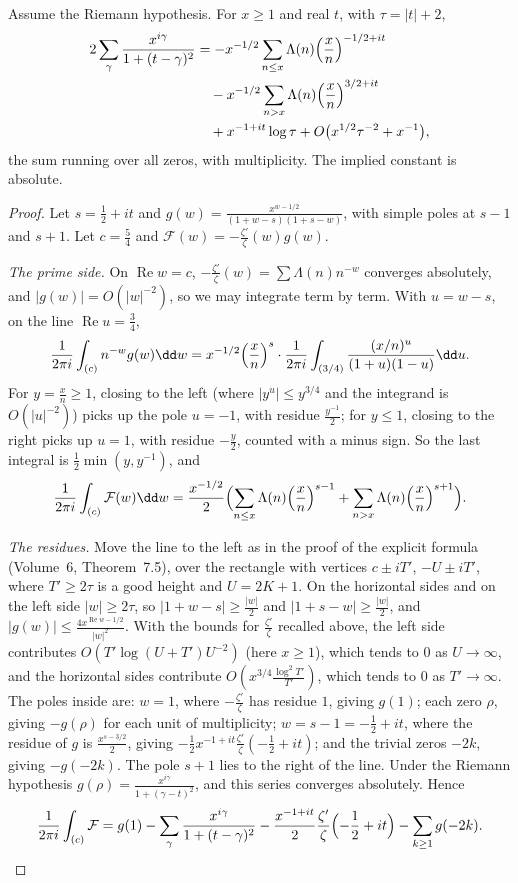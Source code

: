 \begin{lemma}\label{lem:montexplicit}
Assume the Riemann hypothesis. For $x\ge1$ and real $t$, with $\tau=|t|+2$,
\[
\begin{aligned}2\sum_\gamma\frac{x^{i\gamma}}{1+(t-\gamma)^2}&=-x^{-1/2}\sum_{n\le x}\Lambda(n)\Bigl(\frac xn\Bigr)^{-1/2+it}\\&\quad-x^{-1/2}\sum_{n>x}\Lambda(n)\Bigl(\frac xn\Bigr)^{3/2+it}\\&\quad+x^{-1+it}\log\tau+O\bigl(x^{1/2}\tau^{-2}+x^{-1}\bigr),\end{aligned}
\]
the sum running over all zeros, with multiplicity. The implied constant is absolute.
\end{lemma}
\begin{proof}
Let $s=\frac12+it$ and $g(w)=\frac{x^{w-1/2}}{(1+w-s)(1+s-w)}$, with simple poles at $s-1$ and $s+1$. Let $c=\frac54$ and $\mathcal F(w)=-\frac{\zeta'}\zeta(w)g(w)$.

\emph{The prime side.} On $\operatorname{Re}w=c$, $-\frac{\zeta'}\zeta(w)=\sum\Lambda(n)n^{-w}$ converges absolutely, and $|g(w)|=O(|w|^{-2})$, so we may integrate term by term. With $u=w-s$, on the line $\operatorname{Re}u=\frac34$,
\[
\frac1{2\pi i}\int_{(c)}n^{-w}g(w)\dd w=x^{-1/2}\Bigl(\frac xn\Bigr)^s\cdot\frac1{2\pi i}\int_{(3/4)}\frac{(x/n)^u}{(1+u)(1-u)}\dd u.
\]
For $y=\frac xn\ge1$, closing to the left (where $|y^u|\le y^{3/4}$ and the integrand is $O(|u|^{-2})$) picks up the pole $u=-1$, with residue $\frac{y^{-1}}2$; for $y\le1$, closing to the right picks up $u=1$, with residue $-\frac y2$, counted with a minus sign. So the last integral is $\frac12\min(y,y^{-1})$, and
\[
\frac1{2\pi i}\int_{(c)}\mathcal F(w)\dd w=\frac{x^{-1/2}}2\Bigl(\sum_{n\le x}\Lambda(n)\Bigl(\frac xn\Bigr)^{s-1}+\sum_{n>x}\Lambda(n)\Bigl(\frac xn\Bigr)^{s+1}\Bigr).
\]

\emph{The residues.} Move the line to the left as in the proof of the explicit formula (Volume~6, Theorem~7.5), over the rectangle with vertices $c\pm iT'$, $-U\pm iT'$, where $T'\ge2\tau$ is a good height and $U=2K+1$. On the horizontal sides and on the left side $|w|\ge2\tau$, so $|1+w-s|\ge\frac{|w|}2$ and $|1+s-w|\ge\frac{|w|}2$, and $|g(w)|\le\frac{4x^{\operatorname{Re}w-1/2}}{|w|^2}$. With the bounds for $\frac{\zeta'}\zeta$ recalled above, the left side contributes $O(T'\log(U+T')U^{-2})$ (here $x\ge1$), which tends to $0$ as $U\to\infty$, and the horizontal sides contribute $O(x^{3/4}\frac{\log^2T'}{T'})$, which tends to $0$ as $T'\to\infty$. The poles inside are: $w=1$, where $-\frac{\zeta'}\zeta$ has residue $1$, giving $g(1)$; each zero $\rho$, giving $-g(\rho)$ for each unit of multiplicity; $w=s-1=-\frac12+it$, where the residue of $g$ is $\frac{x^{s-3/2}}2$, giving $-\frac12x^{-1+it}\frac{\zeta'}\zeta(-\frac12+it)$; and the trivial zeros $-2k$, giving $-g(-2k)$. The pole $s+1$ lies to the right of the line. Under the Riemann hypothesis $g(\rho)=\frac{x^{i\gamma}}{1+(\gamma-t)^2}$, and this series converges absolutely. Hence
\[
\frac1{2\pi i}\int_{(c)}\mathcal F=g(1)-\sum_\gamma\frac{x^{i\gamma}}{1+(t-\gamma)^2}-\frac{x^{-1+it}}2\frac{\zeta'}\zeta\Bigl(-\frac12+it\Bigr)-\sum_{k\ge1}g(-2k).
\]


\end{proof}
